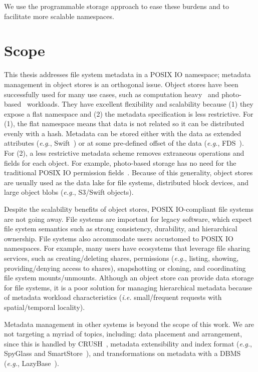We use the programmable storage approach to ease these burdens and to
facilitate more scalable namespaces.

\section{Scope}

This thesis addresses file system metadata in a POSIX IO namespace; metadata
management in object stores is an orthogonal issue.  Object stores have been
successfully used for many use cases, such as computation
heavy~\cite{nightingale:osdi2012-fds} and
photo-based~\cite{beaver:osdi2010-haystack} workloads.  They have excellent
flexibility and scalability because (1) they expose a flat namespace and (2)
the metadata specification is less restrictive. For (1), the flat namespace
means that data is not related so it can be distributed evenly with a hash.
Metadata can be stored either with the data as extended attributes ({\it e.g.},
Swift~\cite{toor:nas2012-swift}) or at some pre-defined offset of the data
({\it e.g.}, FDS~\cite{nightingale:osdi2012-fds}). For (2), a less restrictive
metadata scheme removes extraneous operations and fields for each object. For
example, photo-based storage has no need for the traditional POSIX IO
permission fields~\cite{beaver:osdi2010-haystack}. Because of this generality,
object stores are usually used as the data lake for file systems, distributed
block devices, and large object blobs ({\it e.g.}, S3/Swift objects).

Despite the scalability benefits of object stores, POSIX IO-compliant file
systems are not going away. File systems are important for legacy software,
which expect file system semantics such as strong consistency, durability, and
hierarchical ownership.  File systems also accommodate users accustomed to
POSIX IO namespaces. For example, many users have ecosystems that leverage file
sharing services, such as creating/deleting shares, permissions ({\it e.g.},
listing, showing, providing/denying access to shares), snapshotting or
cloning, and coordinating file system mounts/unmounts.  Although an object
store can provide data storage for file systems, it is a poor solution for
managing hierarchical metadata because of metadata workload characteristics
({\it i.e.} small/frequent requests with spatial/temporal locality).

Metadata management in other systems is beyond the scope of this work. We are
not targeting a myriad of topics, including: data placement and arrangement,
since this is handled by CRUSH~\cite{weil:osdi2006-ceph}, metadata
extensibility and index format ({\it e.g.}, SpyGlass\cite{leung:fast2009-spyglass} and
SmartStore~\cite{hua:sc2009-smartstore}), and transformations on metadata with
a DBMS ({\it e.g.}, LazyBase~\cite{cipar:eurosys2012-lazybase}). 




